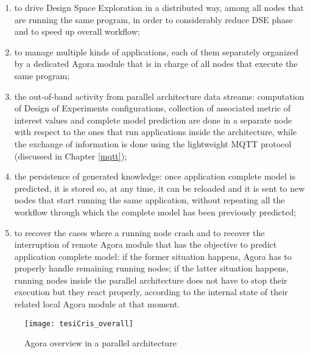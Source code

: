 \begin{enumerate}
    
    \item to drive Design Space Exploration in a distributed way, among all nodes that are running the same program, in order to considerably reduce DSE phase and to speed up overall workflow;
    
    \item to manage multiple kinds of applications, each of them separately organized by a dedicated Agora module that is in charge of all nodes that execute the same program;
    
    \item the out-of-band activity from parallel architecture data streams: computation of Design of Experiments configurations, collection of associated metric of interest values and complete model prediction are done in a separate node with respect to the ones that run applications inside the architecture, while the exchange of information is done using the lightweight MQTT protocol (discussed in Chapter \ref{mqtt});
    
    \item the persistence of generated knowledge: once application complete model is predicted, it is stored so, at any time, it can be reloaded and it is sent to new nodes that start running the same application, without repeating all the workflow through which the complete model has been previously predicted;
    
    \item to recover the cases where a running node crash and to recover the interruption of remote Agora module that has the objective to predict application complete model: if the former situation happens, Agora has to properly handle remaining running nodes; if the latter situation happens, running nodes inside the parallel architecture does not have to stop their execution but they react properly, according to the internal state of their related local Agora module at that moment.

\end{enumerate}

\begin{figure}[H]

    \centering
    \texttt{[image: tesiCris\_overall]}
    \caption{Agora overview in a parallel architecture}
    \label{fig::tesiCris_overview}
    
\end{figure}

